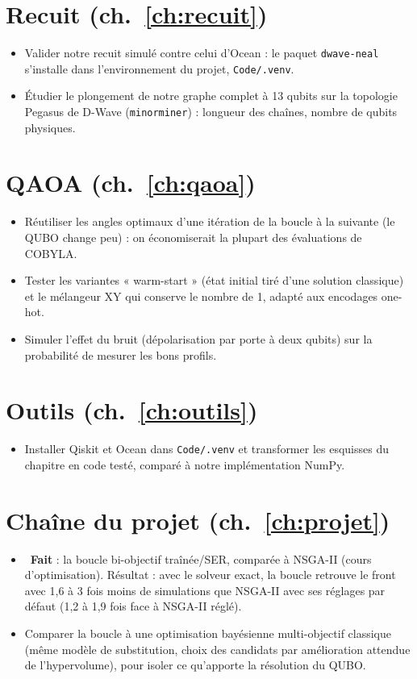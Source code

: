\section*{Recuit (ch.~\ref{ch:recuit})}
\begin{itemize}
\item Valider notre recuit simulé contre celui d'Ocean : le paquet \texttt{dwave-neal} s'installe dans l'environnement du projet, \texttt{Code/.venv}.
\item Étudier le plongement de notre graphe complet à 13 qubits sur la topologie Pegasus de D-Wave (\texttt{minorminer}) : longueur des chaînes, nombre de qubits physiques.
\end{itemize}

\section*{QAOA (ch.~\ref{ch:qaoa})}
\begin{itemize}
\item Réutiliser les angles optimaux d'une itération de la boucle à la suivante (le QUBO change peu) : on économiserait la plupart des évaluations de COBYLA.
\item Tester les variantes « warm-start » (état initial tiré d'une solution classique) et le mélangeur XY qui conserve le nombre de 1, adapté aux encodages one-hot.
\item Simuler l'effet du bruit (dépolarisation par porte à deux qubits) sur la probabilité de mesurer les bons profils.
\end{itemize}

\section*{Outils (ch.~\ref{ch:outils})}
\begin{itemize}
\item Installer Qiskit et Ocean dans \texttt{Code/.venv} et transformer les esquisses du chapitre en code testé, comparé à notre implémentation NumPy.
\end{itemize}

\section*{Chaîne du projet (ch.~\ref{ch:projet})}
\begin{itemize}
\item {}~\textbf{Fait} : la boucle bi-objectif traînée/SER, comparée à NSGA-II (cours d'optimisation). Résultat : avec le solveur exact, la boucle retrouve le front avec 1,6 à 3 fois moins de simulations que NSGA-II avec ses réglages par défaut (1,2 à 1,9 fois face à NSGA-II réglé).
\item Comparer la boucle à une optimisation bayésienne multi-objectif classique (même modèle de substitution, choix des candidats par amélioration attendue de l'hypervolume), pour isoler ce qu'apporte la résolution du QUBO.
\end{itemize}
